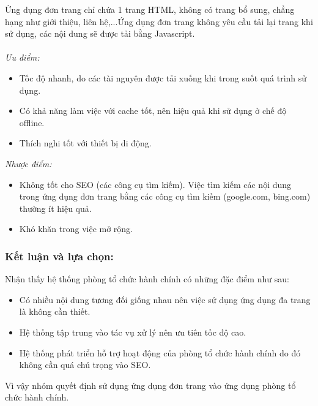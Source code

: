 Ứng dụng đơn trang chỉ chứa 1 trang HTML, không có trang bổ sung, chẳng hạng như giới thiệu, liên hệ,...Ứng dụng đơn trang không yêu cầu tải lại trang khi sử dụng, các nội dung sẽ được tải bằng Javascript.\\\\
\textit{Ưu điểm:}
\begin{itemize}
    \item Tốc độ nhanh, do các tài nguyên được tải xuống khi trong suốt quá trình sử dụng.
    \item Có khả năng làm việc với cache tốt, nên hiệu quả khi sử dụng ở chế độ offline.
    \item Thích nghi tốt với thiết bị di động.
\end{itemize}
\textit{Nhược điểm:}
\begin {itemize}
    \item Không tốt cho SEO (các công cụ tìm kiếm). Việc tìm kiếm các nội dung trong ứng dụng đơn trang bằng các công cụ tìm kiếm (google.com, bing.com) thường ít hiệu quả.
    \item Khó khăn trong việc mở rộng.
\end {itemize}
\subsubsection{Kết luận và lựa chọn:}
Nhận thấy hệ thống phòng tổ chức hành chính có những đặc điểm như sau:
\begin {itemize}
    \item Có nhiều nội dung tương đối giống nhau nên việc sử dụng ứng dụng đa trang là không cần thiết.
    \item Hệ thống tập trung vào tác vụ xử lý nên ưu tiên tốc độ cao.
    \item Hệ thống phát triển hỗ trợ hoạt động của phòng tổ chức hành chính do đó không cần quá chú trọng vào SEO.
\end {itemize}

Vì vậy nhóm quyết định sử dụng ứng dụng đơn trang vào ứng dụng phòng tổ chức hành chính.




